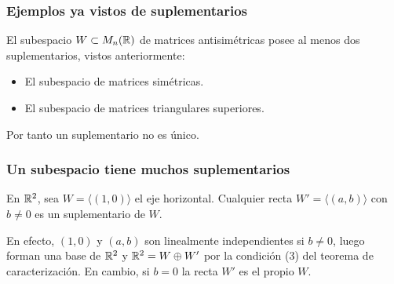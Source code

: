 \begin{frame}
    \frametitle{Ejemplos ya vistos de suplementarios}

    El subespacio $W\subset M_n(\mathbb{R})$ de matrices \alert{antisimétricas} posee al menos dos suplementarios, vistos anteriormente:

    \begin{itemize}
        \item El subespacio de matrices \alert{simétricas}.
        \item El subespacio de matrices
        \alert{triangulares superiores}.
    \end{itemize}

    Por tanto un suplementario \alert{no es único}.
\end{frame}


\begin{frame}
    \frametitle{Un subespacio tiene muchos suplementarios}

    \begin{example}
        En $\mathbb{R}^2$, sea $W=\langle(1,0)\rangle$ el eje horizontal. Cualquier
        recta $W'=\langle(a,b)\rangle$ con $b\neq0$ es un suplementario
        de $W$.
    \end{example}

    En efecto, $(1,0)$ y $(a,b)$ son linealmente independientes si $b\neq0$,
    luego forman una base de $\mathbb{R}^2$ y $\mathbb{R}^2=W\oplus W'$ por la
    condición (3) del teorema de caracterización. En cambio, si $b=0$ la
    recta $W'$ es el propio $W$.

    \medskip

    \begin{center}
    \end{center}
\end{frame}


